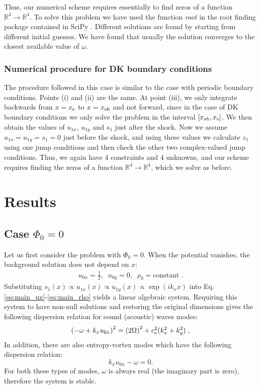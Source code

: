 \documentclass[useAMS,usenatbib]{mn2e}
\begin{document}
Thus, our numerical scheme requires essentially to find zeros of a function $\mathbb{R}^4\to\mathbb{R}^4$. To solve this problem we have used the function \emph{root} in the root finding package contained in SciPy \citep{scipy}. Different solutions are found by starting from different initial guesses. We have found that usually the solution converges to the closest available value of $\omega$.

\subsubsection{Numerical procedure for DK boundary conditions}
%
The procedure followed in this case is similar to the case with periodic boundary conditions. Points (i) and (ii) are the same. At point (iii), we only integrate backwards from $x=x_{\rm s}$ to $x=x_{\rm sh}$ and not forward, since in the case of DK boundary conditions we only solve the problem in the interval $[x_{\rm sh},x_{\rm s}]$. We then obtain the values of $u_{1x}$, $u_{1y}$ and $s_1$ just after the shock. Now we assume $u_{1x}=u_{1y}=s_1=0$ just before the shock, and using these values we calculate $z_1$ using one jump conditions and then check the other two complex-valued jump conditions. Thus, we again have 4 constraints and 4 unknowns, and our scheme requires finding the zeros of a function $\mathbb{R}^4\to\mathbb{R}^4$, which we solve as before.

\section{Results} \label{sec:results}

\subsection{Case $\Phi_0=0$} \label{sec:stabilitytrivial}

Let us first consider the problem with $\Phi_0=0$. When the potential vanishes, the background solution does not depend on $x$:
%
\begin{align}
u_{0x} = \frac{1}{2},\;\; u_{0y} = 0,\;\;  \rho_0 = \text{constant}\;.
\end{align}
%
Substituting $s_1\left(x\right)\propto u_{1x}\left(x\right)\propto u_{1y}\left(x\right)\propto\exp\left(ik_x x\right)$ into Eq. \eqref{eq:main_ux}-\eqref{eq:main_rho} yields a linear algebraic system. Requiring this system to have non-null solutions and restoring the original dimensions gives the following dispersion relation for sound (acoustic) waves modes:
\begin{equation}
\left(-\omega + k_x u_{0x} \right)^2 = \left( 2 \Omega \right)^2 + c_{\rm s}^2 (k_x^2 + k_y^2) \;,\label{eq:disp}
\end{equation}
In addition, there are also entropy-vortex modes \citep[see for example Appendix \ref{appendix:landau} and][]{landau} which have the following dispersion relation:
\begin{equation}
k_x u_{0x} - \omega = 0. \label{eq:dispev}
\end{equation}
For both these types of modes, $\omega$ is always real (the imaginary part is zero), therefore the system is stable. 
\end{document}
